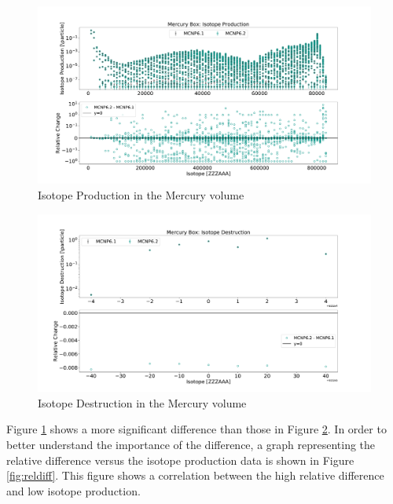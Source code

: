 \begin{figure}[h!]
        \centering
        \includegraphics[scale=0.4]{figs/prod_merbox_62_61.pdf}
	\caption{Isotope Production in the Mercury volume}
        \label{fig:prod}
\end{figure}

\begin{figure}[h!]
        \centering
        \includegraphics[scale=0.4]{figs/dest_merbox_62_61.pdf}
	\caption{Isotope Destruction in the Mercury volume}
        \label{fig:dest}
\end{figure}

Figure \ref{fig:prod} shows a more significant difference than those in
Figure \ref{fig:dest}. In order to better understand the importance of
the difference, a graph representing the relative difference versus the
isotope production data is shown in Figure \ref{fig:reldiff}. This 
figure shows a correlation between the high relative difference and
low isotope production.

